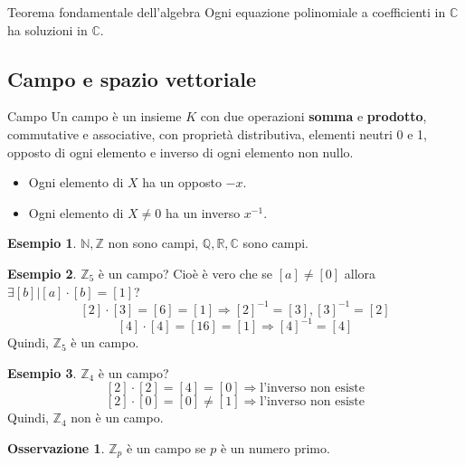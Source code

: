 \documentclass[a4paper]{article}
\theoremstyle{definition}
\newtheorem*{oss}{Osservazione}
\newtheorem*{es}{Esempio}
\begin{document}
\begin{teo}{Teorema fondamentale dell'algebra}{}
	Ogni equazione polinomiale a coefficienti in $\mathbb{C}$ ha soluzioni in $\mathbb{C}$.
\end{teo}

\subsection{Campo e spazio vettoriale}
\begin{deff}{Campo}{}
	Un campo è un insieme $K$ con due operazioni \textbf{somma} e \textbf{prodotto}, commutative e associative, con proprietà distributiva, elementi neutri 0 e 1, opposto di ogni elemento e inverso di ogni elemento non nullo.
	\begin{itemize}
		\item Ogni elemento di $X$ ha un opposto $-x$.
		\item Ogni elemento di $X \ne 0$ ha un inverso $x^{-1}$.
	\end{itemize}
	\begin{es}
		$\mathbb{N}, \mathbb{Z}$ non sono campi, $\mathbb{Q}, \mathbb{R}, \mathbb{C}$ sono campi.
	\end{es}
\end{deff}

\begin{es}
	$\mathbb{Z}_5$ è un campo? Cioè è vero che se $[a] \ne [0]$ allora $\exists [b] | [a] \cdot [b] = [1]$?
	\[ [2] \cdot [3] = [6] = [1] \Rightarrow [2]^{-1} = [3], [3]^{-1} = [2] \]
	\[ [4] \cdot [4] = [16] = [1] \Rightarrow [4]^{-1} = [4] \]
	Quindi, $\mathbb{Z}_5$ è un campo.
\end{es}

\begin{es}
	$\mathbb{Z}_4$ è un campo?
	\[ [2] \cdot [2] = [4] = [0] \Rightarrow \text{l'inverso non esiste} \]
	\[ [2] \cdot [0] = [0] \ne [1] \Rightarrow \text{l'inverso non esiste} \]
	Quindi, $\mathbb{Z}_4$ non è un campo.
\end{es}

\begin{oss}
	$\mathbb{Z}_p$ è un campo se $p$ è un numero primo.
\end{oss}
\end{document}
